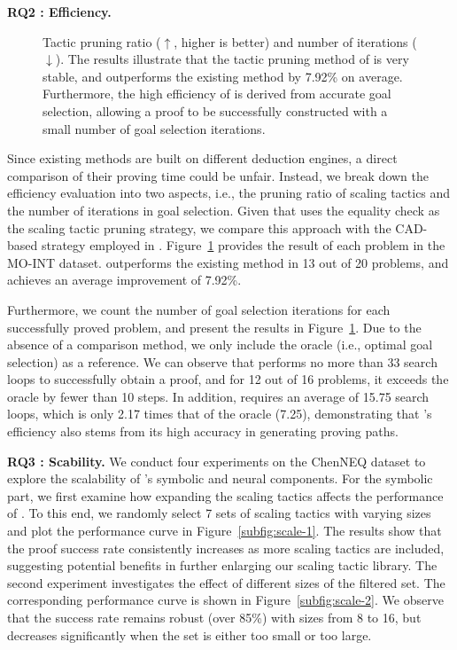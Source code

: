 \textbf{RQ2 : Efficiency. }
\begin{figure}[t] 
\centering
{}
\hfill
{}
\vspace{-0.75em}
\caption{Tactic pruning ratio ($\uparrow$, higher is better) and number of iterations ($\downarrow$). The results illustrate that the tactic pruning method of \name is very stable, and outperforms the existing method by 7.92\% on average. Furthermore, the high efficiency of \name is derived from accurate goal selection, allowing a proof to be successfully constructed with a small number of goal selection iterations.}
\label{fig:efficiency}
\end{figure}
Since existing methods are built on different deduction engines, a direct comparison of their proving time could be unfair. 
Instead, we break down the efficiency evaluation into two aspects, i.e., the pruning ratio of scaling tactics and the number of iterations in goal selection.  
Given that \aips uses the equality check as the scaling tactic pruning strategy, we compare this approach with the CAD-based strategy employed in \name. 
Figure~\ref{fig:efficiency} provides the result of each problem in the MO-INT dataset. 
\name outperforms the existing method in 13 out of 20 problems, and achieves an average improvement of 7.92\%.

Furthermore, we count the number of goal selection iterations for each successfully proved problem, and present the results in Figure~\ref{fig:efficiency}. 
Due to the absence of a comparison method, we only include the oracle (i.e., optimal goal selection) as a reference.
We can observe that \name performs no more than 33 search loops to successfully obtain a proof, and for 12 out of 16 problems, it exceeds the oracle by fewer than 10 steps.
In addition, \name requires an average of 15.75 search loops, which is only 2.17 times that of the oracle (7.25),
demonstrating that \name's efficiency also stems from its high accuracy in generating proving paths.

\textbf{RQ3 : Scability. }
We conduct four experiments on the ChenNEQ dataset to explore the scalability of \name's symbolic and neural components. 
For the symbolic part,
we first examine how expanding the scaling tactics affects the performance of \name. 
To this end,
we randomly select 7 sets of scaling tactics with varying sizes and plot the performance curve in Figure~\ref{subfig:scale-1}. 
The results show that the proof success rate consistently increases as more scaling tactics are included, suggesting potential benefits in further enlarging our scaling tactic library.
The second experiment investigates the effect of different sizes of the filtered set. 
The corresponding performance curve is shown in Figure~\ref{subfig:scale-2}.
We observe that the success rate remains robust (over 85\%) with sizes from 8 to 16, but decreases significantly when the set is either too small or too large.


